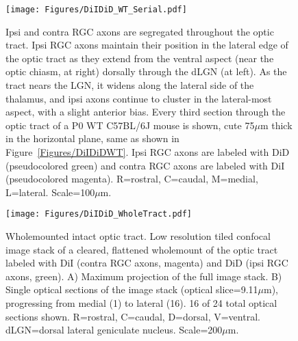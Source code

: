 \begin{figure}[hbtp]
    \begin{center}
        \texttt{[image: Figures/DiIDiD\_WT\_Serial.pdf]}
        \caption[Ipsi and contra RGC axons are segregated throughout the optic tract.]
        {Ipsi and contra RGC axons are segregated throughout the optic tract.
        Ipsi RGC axons maintain their position in the lateral edge of the optic tract as they extend from the ventral aspect (near the optic chiasm, at right) dorsally through the dLGN (at left).
        As the tract nears the LGN, it widens along the lateral side of the thalamus, and ipsi axons continue to cluster in the lateral-most aspect, with a slight anterior bias.
        Every third section through the optic tract of a P0 WT C57BL/6J mouse is shown, cute 75$\mu$m thick in the horizontal plane, same as shown in Figure~\ref{Figures/DiIDiDWT}.
        Ipsi RGC axons are labeled with DiD (pseudocolored green) and contra RGC axons are labeled with DiI (pseudocolored magenta).
        R=rostral, C=caudal, M=medial, L=lateral.
        Scale=100$\mu$m.}
        \label{Figures/DiIDiDWTSerial}
    \end{center}
\end{figure}
\begin{figure}[hbtp]
    \begin{center}
        \texttt{[image: Figures/DiIDiD\_WholeTract.pdf]}
        \caption[Wholemounted intact optic tract.]
        {Wholemounted intact optic tract.
        Low resolution tiled confocal image stack of a cleared, flattened wholemount of the optic tract labeled with DiI (contra RGC axons, magenta) and DiD (ipsi RGC axons, green).
        A) Maximum projection of the full image stack.
        B) Single optical sections of the image stack (optical slice=9.11$\mu$m), progressing from medial (1) to lateral (16).
        16 of 24 total optical sections shown.
        R=rostral, C=caudal, D=dorsal, V=ventral.
        dLGN=dorsal lateral geniculate nucleus.
        Scale=200$\mu$m.
        }
        \label{Figures/DiIDiDWholeTract}
    \end{center}
\end{figure}

